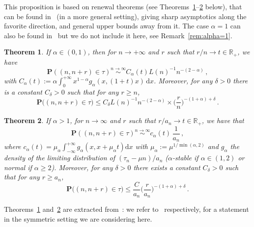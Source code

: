 \documentclass[11pt]{article}
\newtheorem{theo}{Theorem}[section]
\theoremstyle{definition}
\numberwithin{equation}{section}
\numberwithin{figure}{section}
\numberwithin{table}{section}
\newcommand{\ga}{\alpha}
\newcommand{\gd}{\delta}
\newcommand{\dd}{\mathrm{d}}
\newcommand{\bP}{\ensuremath{\mathbf{P}}}
\newcommand{\bbR}{\ensuremath{\mathbb{R}}}
\begin{document}
\begin{appendix}
This proposition is based on renewal theorems (see Theorems~\ref{th:re01}--\ref{th:reD} below), that can be found in~\cite{cf:B} (in a more general setting), giving sharp asymptotics along the favorite direction, and general upper bounds away from it. The case $\ga=1$ can also be found in~\cite{cf:B} but we do not include it here, see Remark~\ref{rem:alpha=1}.


\begin{theo}\label{th:re01}
If $\ga \in (0,1)$, then for $n\to+\infty $ and $r$ such that $r/n \to t \in \bbR_+$, we have
\begin{equation}\label{eq:D01}
\bP \left((n,n+r) \in \tau \right) \stackrel{n \to \infty}\sim C_{\ga}(t) L(n)^{-1} n^{-(2-\ga)}\,,
\end{equation}
with $C_{\ga}(t) := \ga \int_{0}^{+ \infty} x^{1- \ga} g_\ga (x, (1+t) x)\,\dd x$. Moreover, for any $\gd>0$ there is a constant $C_{\gd}>0$ such that for any $r\geq n$,
\begin{equation}
\bP\big((n,n+r)\in\tau \big) \leq C_{\gd} L(n)^{-1} n^{-(2-\ga)} \times \Big(\frac{r}{n} \Big)^{-(1+\ga) +\gd}\,.
\end{equation}
\end{theo}



\begin{theo}\label{th:reD}
If $\ga> 1$, for $n \to \infty$ and $r$ such that $r/a_n \to t \in \bbR_+$, we have that
\begin{equation}
\bP \left((n,n+r) \in \tau \right) \stackrel{n \to \infty}\sim c_{\ga}(t)\,\frac{1}{a_n}\,,
\end{equation}
where $c_{\ga}(t) = \mu_\ga \int_{- \infty}^{+ \infty} g_\ga (x,x+\mu_\ga t) \dd x$ with $\mu_\ga := \mu^{1/\min(\ga,2)}$ and $g_{\ga}$ the density of the limiting distribution of $(\tau_n -\mu n)/a_n$ ($\alpha$-stable if $\ga\in(1,2)$ or normal if $\ga\geq 2$). Moreover, for any $\gd>0$ there exists a constant $C_{\gd}>0$ such that for any $r\geq a_n$,
\begin{equation}\label{eq:offdiag}
\bP\big((n, n+r) \in \tau \big) \leq \frac{C}{a_n} \Big(\frac{r}{a_n} \Big)^{-(1+\ga) +\gd}\,.
\end{equation}
\end{theo}

Theorems~\ref{th:re01} and~\ref{th:reD} are extracted from~\cite[Theorems~3.1, 4.1 and Theorems~3.3, 4.2 respectively]{cf:B}: we refer to~\cite[Equations~(3.4), (4.2), (3.7), (4.5)]{cf:B} respectively, for a statement in the symmetric setting we are considering here.
\\[-0.5em]


\end{appendix}
\end{document}

